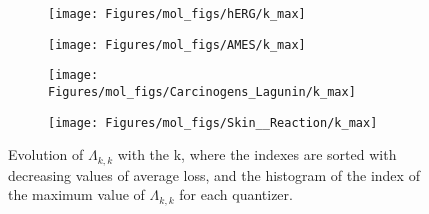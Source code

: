 \begin{figure}
    \centering
    \begin{subfigure}{0.67\textwidth}
        \centering
        \texttt{[image: Figures/mol\_figs/hERG/k\_max]}
    \end{subfigure}
    \begin{subfigure}{0.67\textwidth}
        \centering
        \texttt{[image: Figures/mol\_figs/AMES/k\_max]}
    \end{subfigure}
    \begin{subfigure}{0.67\textwidth}
        \centering
        \texttt{[image: Figures/mol\_figs/Carcinogens\_Lagunin/k\_max]}
    \end{subfigure}
    \begin{subfigure}{0.67\textwidth}
        \centering
        \texttt{[image: Figures/mol\_figs/Skin\_\_Reaction/k\_max]}
    \end{subfigure}
    \caption{
        Evolution of $\Lambda_{k,k}$ with the k, where the indexes are sorted with decreasing values of average loss, and the histogram of the index of the maximum value of $\Lambda_{k,k}$ for each quantizer.
    }
    \label{fig:k_max}
\end{figure}


\FloatBarrier
